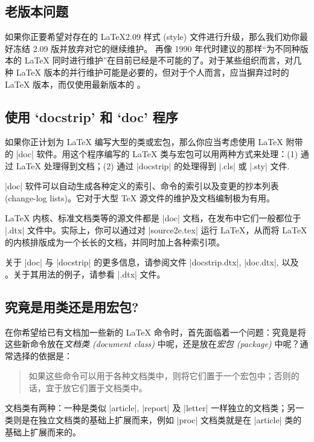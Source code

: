 \documentclass{ltxguide}[1995/11/28]
\begin{document}
\subsection{老版本问题}

如果你正要希望对存在的 \LaTeX 2.09 样式 (style) 文件进行升级，那么我们劝你最好冻结 2.09 版并放弃对它的继续维护。
再像 1990 年代时建议的那样“为不同种版本的 \LaTeX{} 同时进行维护”在目前已经是不可能的了。对于某些组织而言，对几种 \LaTeX{} 版本的并行维护可能是必要的，但对于个人而言，应当摒弃过时的 \LaTeX{} 版本，而仅使用最新版本的 \LaTeXe{}。


\subsection{使用 `docstrip' 和 `doc' 程序}

如果你正计划为 \LaTeX{} 编写大型的类或宏包，那么你应当考虑使用 \LaTeX{} 附带的 |doc| 软件。用这个程序编写的 \LaTeX{} 类与宏包可以用两种方式来处理：(1) 通过 \LaTeX{} 处理得到文档；(2) 通过 |docstrip| 的处理得到 |.cls| 或 |.sty| 文件.

|doc| 软件可以自动生成各种定义的索引、命令的索引以及变更的抄本列表 (change-log lists)。它对于大型 \TeX{} 源文件的维护及文档编制极为有用。

\LaTeX{} 内核、标准文档类等的源文件都是 |doc| 文档，在发布中它们一般都位于 |.dtx|
文件中。实际上，你可以通过对 |source2e.tex| 运行 \LaTeX{}，从而将 \LaTeX{} 的内核排版成为一个长长的文档，并同时加上各种索引项。

关于 |doc| 与 |docstrip| 的更多信息，请参阅文件
 |docstrip.dtx|, |doc.dtx|, 以及 \emph{\LaTeXcomp}。关于其用法的例子，请参看 |.dtx| 文件。

\subsection{究竟是用类还是用宏包?}
\label{Sec:classorpkg}

在你希望给已有文档加一些新的 \LaTeX{} 命令时，首先面临着一个问题：究竟是将这些新命令放在\emph{文档类 (document class)} 中呢，还是放在\emph{宏包 (package)} 中呢？通常选择的依据是：
\begin{quote}
  如果这些命令可以用于各种文档类中，则将它们置于一个宏包中；否则的话，宜于放它们置于文档类中。
\end{quote}

文档类有两种：一种是类似 |article|, |report| 及
 |letter| 一样独立的文档类；另一类则是在独立文档类的基础上扩展而来，例如 |proc| 文档类就是在 |article| 类的基础上扩展而来的。
\end{document}
